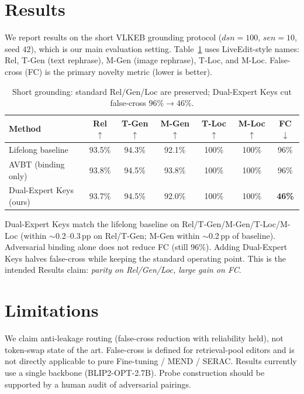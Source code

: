 \documentclass[letterpaper]{article} %
\begin{document}
\section{Results}
\label{sec:results}
We report results on the short VLKEB grounding protocol ($dsn{=}100$, $sen{=}10$, seed $42$), which is our main evaluation setting.
Table~\ref{tab:standard-short} uses LiveEdit-style names: Rel, T-Gen (text rephrase), M-Gen (image rephrase), T-Loc, and M-Loc.
False-cross (FC) is the primary novelty metric (lower is better).

\begin{table}[t]
\centering
\begin{tabular}{lcccccc}
\toprule
Method & Rel$\uparrow$ & T-Gen$\uparrow$ & M-Gen$\uparrow$ & T-Loc$\uparrow$ & M-Loc$\uparrow$ & FC$\downarrow$ \\
\midrule
Lifelong baseline & 93.5\% & 94.3\% & 92.1\% & 100\% & 100\% & 96\% \\
AVBT (binding only) & 93.8\% & 94.5\% & 93.8\% & 100\% & 100\% & 96\% \\
Dual-Expert Keys (ours) & 93.7\% & 94.5\% & 92.0\% & 100\% & 100\% & \textbf{46\%} \\
\bottomrule
\end{tabular}
\caption{Short grounding: standard Rel/Gen/Loc are preserved; Dual-Expert Keys cut false-cross $96\%\!\rightarrow\!46\%$.}
\label{tab:standard-short}
\end{table}

Dual-Expert Keys match the lifelong baseline on Rel/T-Gen/M-Gen/T-Loc/M-Loc (within $\sim$0.2--0.3\,pp on Rel/T-Gen; M-Gen within $\sim$0.2\,pp of baseline).
Adversarial binding alone does not reduce FC (still $96\%$).
Adding Dual-Expert Keys halves false-cross while keeping the standard operating point.
This is the intended Results claim: \emph{parity on Rel/Gen/Loc, large gain on FC}.


\section{Limitations}
We claim anti-leakage routing (false-cross reduction with reliability held), not token-swap state of the art.
False-cross is defined for retrieval-pool editors and is not directly applicable to pure Fine-tuning / MEND / SERAC.
Results currently use a single backbone (BLIP2-OPT-2.7B).
Probe construction should be supported by a human audit of adversarial pairings.
\end{document}
